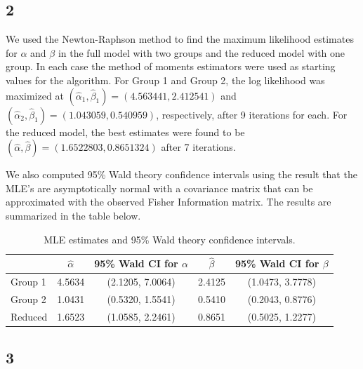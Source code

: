 \documentclass[12pt]{article}
\begin{document}
\subsection*{2}

We used the Newton-Raphson method to find the maximum likelihood estimates for $\alpha$ and $\beta$ in the full model with two groups and the reduced
model with one group. 
In each case the method of moments estimators were used as starting values for the algorithm.
For Group 1 and Group 2, the log likelihood was maximized at $(\hat{\alpha}_1, \hat{\beta}_1) = (4.563441, 2.412541)$ and 
$(\hat{\alpha}_2, \hat{\beta}_1) = (1.043059, 0.540959)$, respectively, after 9 iterations for each. For the reduced model, the best estimates were found to be 
$(\hat{\alpha}, \hat{\beta}) = (1.6522803, 0.8651324)$ after 7 iterations. 

We also computed 95\% Wald theory confidence intervals using the result that the MLE's are asymptotically normal with a covariance matrix that can be
approximated with the observed Fisher Information matrix. The results are summarized in the table below.

\begin{table}[h]
  \begin{center}
    \begin{tabular}{|l|c|c|c|c|}
      \hline
      & $\hat{\alpha}$ & 95\% Wald CI for $\alpha$ & $\hat{\beta}$ & 95\% Wald CI for $\beta$ \\
      \hline 
      Group 1 & 4.5634 & (2.1205, 7.0064) & 2.4125 & (1.0473, 3.7778) \\
      \hline
      Group 2 & 1.0431 & (0.5320, 1.5541) & 0.5410 & (0.2043, 0.8776) \\
      \hline
      Reduced & 1.6523 & (1.0585, 2.2461) & 0.8651 & (0.5025, 1.2277) \\
      \hline
    \end{tabular}
  \end{center}
  \caption{MLE estimates and 95\% Wald theory confidence intervals.}
\end{table}



\subsection*{3}
\end{document}
